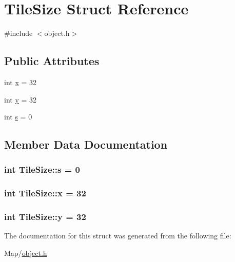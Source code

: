 \hypertarget{structTileSize}{}\section{Tile\+Size Struct Reference}
\label{structTileSize}


{\ttfamily \#include $<$object.\+h$>$}

\subsection*{Public Attributes}
\begin{DoxyCompactItemize}
\item 
int \hyperlink{structTileSize_add80f453cede5e47fc0c598c1660e174}{x} = 32
\item 
int \hyperlink{structTileSize_a1ee6672b06f91d6100c93e6664ada05e}{y} = 32
\item 
int \hyperlink{structTileSize_ad2b8b0f1bf57c2d662533a870e0fc2a6}{s} = 0
\end{DoxyCompactItemize}


\subsection{Member Data Documentation}
\subsubsection[{\texorpdfstring{s}{s}}]{\setlength{\rightskip}{0pt plus 5cm}int Tile\+Size\+::s = 0}\hypertarget{structTileSize_ad2b8b0f1bf57c2d662533a870e0fc2a6}{}\label{structTileSize_ad2b8b0f1bf57c2d662533a870e0fc2a6}
\subsubsection[{\texorpdfstring{x}{x}}]{\setlength{\rightskip}{0pt plus 5cm}int Tile\+Size\+::x = 32}\hypertarget{structTileSize_add80f453cede5e47fc0c598c1660e174}{}\label{structTileSize_add80f453cede5e47fc0c598c1660e174}
\subsubsection[{\texorpdfstring{y}{y}}]{\setlength{\rightskip}{0pt plus 5cm}int Tile\+Size\+::y = 32}\hypertarget{structTileSize_a1ee6672b06f91d6100c93e6664ada05e}{}\label{structTileSize_a1ee6672b06f91d6100c93e6664ada05e}


The documentation for this struct was generated from the following file\+:\begin{DoxyCompactItemize}
\item 
Map/\hyperlink{object_8h}{object.\+h}\end{DoxyCompactItemize}
